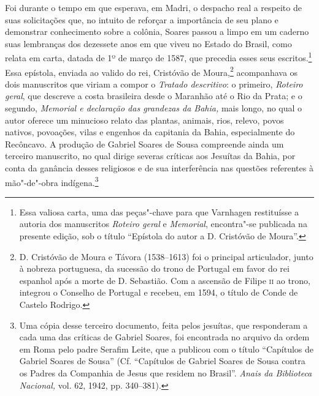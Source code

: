Foi durante o tempo em que esperava, em Madri, o despacho
real a respeito de suas solicitações que, no intuito de reforçar a
importância de seu plano e demonstrar conhecimento sobre a colônia,
Soares passou a limpo em um caderno suas lembranças dos dezessete anos
em que viveu no Estado do Brasil, como relata em carta, datada de 1º de
março de 1587, que precedia esses seus escritos.\footnote{ Essa valiosa
carta, uma das peças"-chave para que Varnhagen restituísse a autoria dos
manuscritos \textit{Roteiro geral} e \textit{Memorial}, encontra"-se
publicada na presente edição, sob o título “Epístola do autor a D.
Cristóvão de Moura”.} Essa epístola, enviada ao valido do
rei, Cristóvão de Moura,\footnote{ D. Cristóvão de Moura e Távora
(1538--1613) foi o principal articulador, junto à nobreza portuguesa, da
sucessão do trono de Portugal em favor do rei espanhol após a morte de
D. Sebastião. Com a ascensão de Filipe 	\textsc{ii} ao trono, integrou o Conselho
de Portugal e recebeu, em 1594, o título de Conde de Castelo Rodrigo.}
acompanhava os dois manuscritos que viriam a compor o \textit{Tratado
descritivo}: o primeiro, \textit{Roteiro geral}, que descreve a costa
brasileira desde o Maranhão até o Rio da Prata; e o segundo,\textit{
Memorial e declaração das grandezas da Bahia,} mais longo, no qual o
autor oferece um minucioso relato das plantas, animais, rios, relevo,
povos nativos, povoações, vilas e engenhos da capitania da Bahia,
especialmente do Recôncavo.  A produção de Gabriel Soares de Sousa
compreende ainda um terceiro manuscrito, no qual dirige severas
críticas aos Jesuítas da Bahia, por conta da ganância desses religiosos
e de sua interferência nas questões referentes à mão"-de"-obra
indígena.\footnote{ Uma cópia desse terceiro documento, feita pelos
jesuítas, que responderam a cada uma das críticas de Gabriel Soares,
foi encontrada no arquivo da ordem em Roma pelo padre Serafim Leite,
que a publicou com o título “Capítulos de Gabriel Soares de Sousa”
(Cf. “Capítulos de Gabriel Soares de Sousa contra os Padres da
Companhia de Jesus que residem no Brasil”. \textit{Anais da Biblioteca
Nacional,} vol. 62, 1942, pp. 340--381).} 


